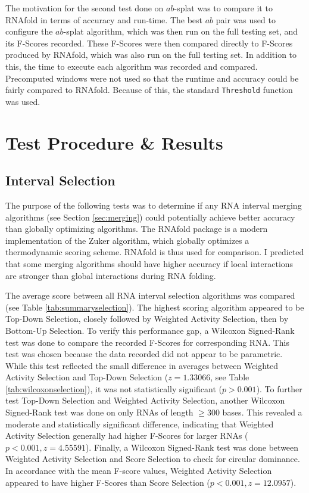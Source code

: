 \documentclass{cshonours}
\begin{document}
The motivation for the second test done on $ab$-splat was to compare it to RNAfold in terms of accuracy and run-time. The best $ab$ pair was used to configure the $ab$-splat algorithm, which was then run on the full testing set, and its F-Scores recorded. These F-Scores were then compared directly to F-Scores produced by RNAfold, which was also run on the full testing set. In addition to this, the time to execute each algorithm was recorded and compared. Precomputed windows were not used so that the runtime and accuracy could be fairly compared to RNAfold. Because of this, the standard \texttt{Threshold} function was used.


\section{Test Procedure \& Results}

\subsection{Interval Selection}
The purpose of the following tests was to determine if any RNA interval merging algorithms (see Section \ref{sec:merging}) could potentially achieve better accuracy than globally optimizing algorithms. The RNAfold package is a modern implementation of the Zuker algorithm, which globally optimizes a thermodynamic scoring scheme. RNAfold is thus used for comparison. I predicted that some merging algorithms should have higher accuracy if local interactions are stronger than global interactions during RNA folding.

The average score between all RNA interval selection algorithms was compared (see Table \ref{tab:summaryselection}). The highest scoring algorithm appeared to be Top-Down Selection, closely followed by Weighted Activity Selection, then by Bottom-Up Selection. To verify this performance gap, a Wilcoxon Signed-Rank test was done to compare the recorded F-Scores for corresponding RNA. This test was chosen because the data recorded did not appear to be parametric. While this test reflected the small difference in averages between Weighted Activity Selection and Top-Down Selection ($z = 1.33066$, see Table \ref{tab:wilcoxonselection}), it was not statistically significant ($p > 0.001$). To further test Top-Down Selection and Weighted Activity Selection, another Wilcoxon Signed-Rank test was done on only RNAs of length $\geq 300$ bases. This revealed a moderate and statistically significant difference, indicating that Weighted Activity Selection generally had higher F-Scores for larger RNAs ($p < 0.001, z = 4.55591$). Finally, a Wilcoxon Signed-Rank test was done between Weighted Activity Selection and Score Selection to check for circular dominance. In accordance with the mean F-score values, Weighted Activity Selection appeared to have higher F-Scores than Score Selection ($p < 0.001, z = 12.0957$).
\end{document}
